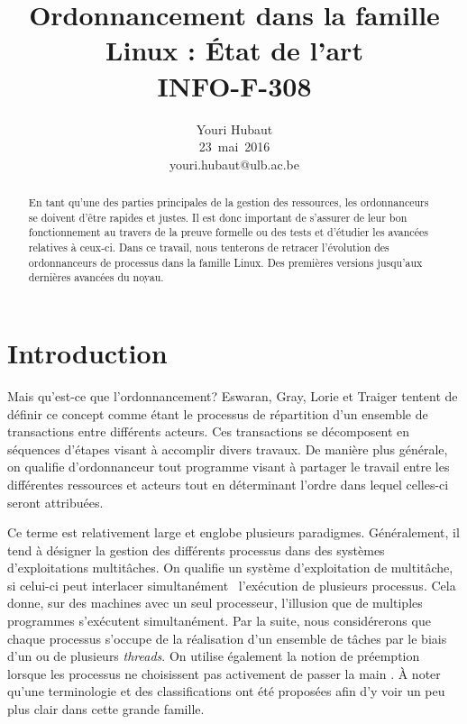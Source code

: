 \documentclass[letterpaper]{article}
\title{Ordonnancement dans la famille Linux : État de l'art \\
INFO-F-308}
\author{Youri Hubaut \\
\mbox{23 mai 2016}\\
youri.hubaut@ulb.ac.be}
\begin{document}
\pagestyle{fancy}
\fancyhf{}
\renewcommand{\headrulewidth}{0pt}
\cfoot{\thepage}

\maketitle

\begin{abstract}

En tant qu'une des parties principales de la gestion des ressources, les ordonnanceurs se doivent d'être rapides et justes. Il est donc important de s'assurer de leur bon fonctionnement au travers de la preuve formelle ou des tests et d'étudier les avancées relatives à ceux-ci. Dans ce travail, nous tenterons de retracer l'évolution des ordonnanceurs de processus dans la famille Linux. Des premières versions jusqu'aux dernières avancées du noyau.

\end{abstract}

\section{Introduction}

Mais qu'est-ce que l'ordonnancement? Eswaran, Gray, Lorie et Traiger \citep{Eswaran:1976:NPC:360363.360369} tentent de définir ce concept comme étant le processus de répartition d'un ensemble de transactions entre différents acteurs. Ces transactions se décomposent en séquences d'étapes visant à accomplir divers travaux. De manière plus générale, on qualifie d'ordonnanceur tout programme visant à partager le travail entre les différentes ressources et acteurs tout en déterminant l'ordre dans lequel celles-ci seront attribuées.

Ce terme est relativement large et englobe plusieurs paradigmes. Généralement, il tend à désigner la gestion des différents processus dans des systèmes d'exploitations multitâches. On qualifie un système d'exploitation de multitâche, si celui-ci peut interlacer \og simultanément \fg ~l'exécution de plusieurs processus. Cela donne, sur des machines avec un seul processeur, l'illusion que de multiples programmes s'exécutent simultanément. Par la suite, nous considérerons que chaque processus s'occupe de la réalisation d'un ensemble de tâches par le biais d'un ou de plusieurs \textit{threads}. On utilise également la notion de préemption lorsque les processus ne choisissent pas activement de passer la main \citep{Bach:1986:DUO:8570}. À noter qu'une terminologie \citep{Casavant:1988:TSG:630789.630963} et des classifications \citep{DBLP:journals/tc/WangM85} ont été proposées afin d'y voir un peu plus clair dans cette grande famille.
\end{document}
